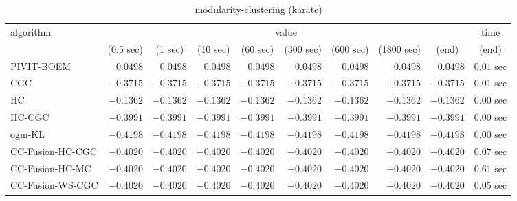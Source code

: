 \begin{table}[H]
\scriptsize
\centering
\caption{modularity-clustering (karate)}
\label{tab:anytimetable-modularity-clustering-karate}
\begin{tabular}{lrrrrrrrrr}
\toprule
           algorithm &                                   \multicolumn{8}{c}{value} & \multicolumn{1}{c}{time}   \\  
\cmidrule(lr){2-9}\cmidrule(lr){10-10}   
                     & \multicolumn{1}{c}{(0.5 sec)} & \multicolumn{1}{c}{(1 sec)} & \multicolumn{1}{c}{(10 sec)} & \multicolumn{1}{c}{(60 sec)} & \multicolumn{1}{c}{(300 sec)} & \multicolumn{1}{c}{(600 sec)} & \multicolumn{1}{c}{(1800 sec)} & \multicolumn{1}{c}{(end)} & \multicolumn{1}{c}{(end)}   \\ \midrule 
          PIVIT-BOEM & $       0.0498$ & $       0.0498$ & $       0.0498$ & $       0.0498$ & $       0.0498$ & $       0.0498$ & $       0.0498$ & $       0.0498$ & $         0.01$ sec   \\ 
                 CGC & $      -0.3715$ & $      -0.3715$ & $      -0.3715$ & $      -0.3715$ & $      -0.3715$ & $      -0.3715$ & $      -0.3715$ & $      -0.3715$ & $         0.01$ sec   \\ 
                  HC & $      -0.1362$ & $      -0.1362$ & $      -0.1362$ & $      -0.1362$ & $      -0.1362$ & $      -0.1362$ & $      -0.1362$ & $      -0.1362$ & $         0.00$ sec   \\ 
              HC-CGC & $      -0.3991$ & $      -0.3991$ & $      -0.3991$ & $      -0.3991$ & $      -0.3991$ & $      -0.3991$ & $      -0.3991$ & $      -0.3991$ & $         0.00$ sec   \\ 
              ogm-KL & $      -0.4198$ & $      -0.4198$ & $      -0.4198$ & $      -0.4198$ & $      -0.4198$ & $      -0.4198$ & $      -0.4198$ & $      -0.4198$ & $         0.00$ sec   \\ 
    CC-Fusion-HC-CGC & $      -0.4020$ & $      -0.4020$ & $      -0.4020$ & $      -0.4020$ & $      -0.4020$ & $      -0.4020$ & $      -0.4020$ & $      -0.4020$ & $         0.07$ sec   \\ 
     CC-Fusion-HC-MC & $      -0.4020$ & $      -0.4020$ & $      -0.4020$ & $      -0.4020$ & $      -0.4020$ & $      -0.4020$ & $      -0.4020$ & $      -0.4020$ & $         0.61$ sec   \\ 
    CC-Fusion-WS-CGC & $      -0.4020$ & $      -0.4020$ & $      -0.4020$ & $      -0.4020$ & $      -0.4020$ & $      -0.4020$ & $      -0.4020$ & $      -0.4020$ & $         0.05$ sec   \\ 

\end{tabular}
\end{table}
